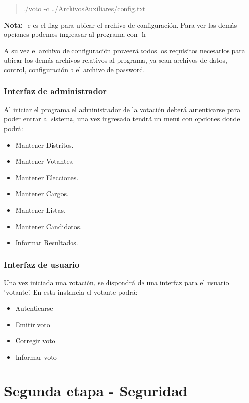 \documentclass[a4paper,10pt]{article}
\begin{document}
\begin{quote}
 ./voto -c ../ArchivosAuxiliares/config.txt
\end{quote}
\textbf{Nota:} -c es el flag para ubicar el archivo de configuración. Para ver las demás opciones podemos ingreasar al programa con -h

A su vez el archivo de configuración proveerá todos los requisitos necesarios para ubicar los demás archivos relativos al programa, ya sean archivos de datos, control, configuración o el archivo de password.


\subsubsection{Interfaz de administrador}

Al iniciar el programa el administrador de la votación deberá autenticarse para poder entrar al sistema, una vez ingresado tendrá un menú con opciones donde podrá:

\begin{itemize}
\item Mantener Distritos.
\item Mantener Votantes.
\item Mantener Elecciones.
\item Mantener Cargos.
\item Mantener Listas.
\item Mantener Candidatos.
\item Informar Resultados.
\end{itemize}


\subsubsection{Interfaz de usuario}

Una vez iniciada una votación, se dispondrá de una interfaz para el usuario 'votante'. En esta instancia el votante podrá:

\begin{itemize}
\item Autenticarse
\item Emitir voto
\item Corregir voto
\item Informar voto
\end{itemize}

\newpage


\section{Segunda etapa - Seguridad}
\end{document}
